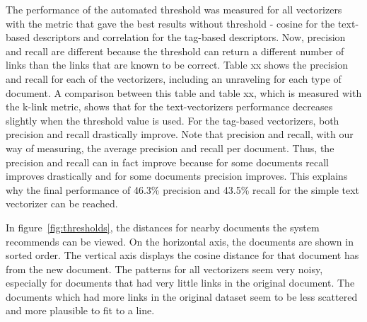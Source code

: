 The performance of the automated threshold was measured for all vectorizers
with the metric that gave the best results without threshold - cosine for the
text-based descriptors and correlation for the tag-based descriptors. Now,
precision and recall are different because the threshold can return a different
number of links than the links that are known to be correct. Table xx shows the
precision and recall for each of the vectorizers, including an unraveling for
each type of document. A comparison between this table and table xx, which is
measured with the k-link metric, shows that for the text-vectorizers
performance decreases slightly when the threshold value is used. 
For the tag-based vectorizers, both precision and recall drastically
improve. Note that precision and recall, with our way of measuring, the average
precision and recall per document. Thus, the precision and recall can in fact
improve because for some documents recall improves drastically and for some
documents precision improves. This explains why the final performance of 46.3\%
precision and 43.5\% recall for the simple text vectorizer can be reached. 

In figure~\ref{fig:thresholds}, the distances for nearby documents the system
recommends can be viewed. On the horizontal axis, the documents are shown in
sorted order. The vertical axis displays the cosine distance for that document
has from the new document. The patterns for all vectorizers seem very noisy,
especially for documents that had very little links in the original document.
The documents which had more links in the original dataset seem to be less
scattered and more plausible to fit to a line.

